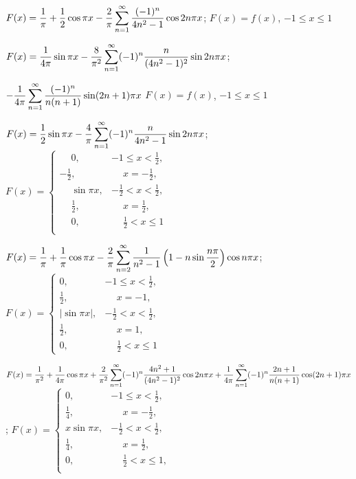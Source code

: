 $F(x)=\displaystyle\frac{1}{\pi}+\frac{1}{2}\cos\pi x-\frac{2}{\pi}\sum_{n=1}^\infty
\frac{(-1)^n}{4n^2-1}\cos2n\pi x$;
\quad $F(x)=f(x)$, $-1\le x\le1$

$F(x)=\displaystyle{\frac{1}{4\pi}\sin\pi x-\frac{8}{\pi^2}\sum_{n=1}^\infty
(-1)^n\frac{n}{(4n^2-1)^2}\sin2n\pi x}$;

\;  \qquad \qquad $\displaystyle{-\frac{1}{4\pi}\sum_{n=1}^\infty
\frac{(-1)^n}{n(n+1)}\sin(2n+1)\pi x}$   \quad
$F(x)=f(x)$, $-1\le x\le1$

$F(x)=\displaystyle\frac{1}{2}\sin\pi x-\frac{4}{\pi}\sum_{n=1}^\infty
(-1)^n\frac{n}{4n^2-1}\sin2n\pi x$;  \quad
$F(x)=
\begin{cases}
\phantom{-}0,&-1\le x<\frac{1}{2},\\
-\frac{1}{2},&\phantom{-}x=-\frac{1}{2},\\
\phantom{-}\sin\pi x,&-\frac{1}{2}<x<\frac{1}{2},\\
\phantom{-}\frac{1}{2},&\phantom{-}x=\frac{1}{2},\\
\phantom{-}0,&\phantom{-}\frac{1}{2}<x\le1\\
\end{cases}$

$F(x)=\displaystyle\frac{1}{\pi}+\frac{1}{\pi}\cos\pi x-\frac{2}{\pi}
\sum_{n=2}^\infty\frac{1}{n^2-1}\left(1-n\sin\frac{n\pi}{2}\right)
\cos n\pi x$; $F(x)=
\begin{cases}
0,&-1\le x<\frac{1}{2},\\
\frac{1}{2},&\phantom{-}x=-1,\\
|\sin\pi x|,&-\frac{1}{2}<x<\frac{1}{2},\\
\frac{1}{2},&\phantom{-}x=1,\\
0,&\phantom{-}\frac{1}{2}<x\le1
\end{cases}$

$F(x)=\displaystyle\frac{1}{\pi^2}+\frac{1}{4\pi}\cos\pi
x+\frac{2}{\pi^2}\sum_{n=1}^\infty
(-1)^n\frac{4n^2+1}{(4n^2-1)^2}\cos2n\pi x+\displaystyle{\frac{1}{4\pi}\sum_{n=1}^\infty
(-1)^n\frac{2n+1}{n(n+1)}\cos(2n+1)\pi x}$; $F(x)=
\begin{cases}
0,&-1\le x<\frac{1}{2},\\
\frac{1}{4},&\phantom{-}x=-\frac{1}{2},\\
x\sin\pi x,&-\frac{1}{2}<x<\frac{1}{2},\\
\frac{1}{4},&\phantom{-}x=\frac{1}{2},\\
0,&\phantom{-}\frac{1}{2}<x\le1,\\
\end{cases}$

